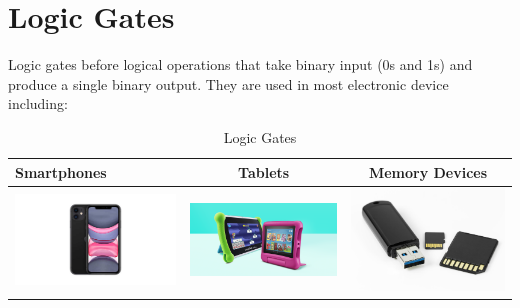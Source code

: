\documentclass{article}
\begin{document}
\section{Logic Gates}
Logic gates before logical operations that take binary input (0s and 1s) and produce a single binary output. They are used in most electronic device including:

\begin{table}
	\begin{center}
		\caption{Logic Gates}
		\label{tab:table1}
		\begin{tabular}{|l|c|c|}
			\hline
			Smartphones
			&
			Tablets
			&
			Memory Devices
			\\
		  \hline
		  \includegraphics[width=0.4\linewidth]{share.jpg}
		  &
		  \includegraphics[width=0.4\linewidth]{best.png}
		  &
		  \includegraphics[width=0.4\linewidth]{istock.jpg}
		  \\
		    \hline
		    
		    
		\end{tabular}
	\end{center}
\end{table}
\end{document}
